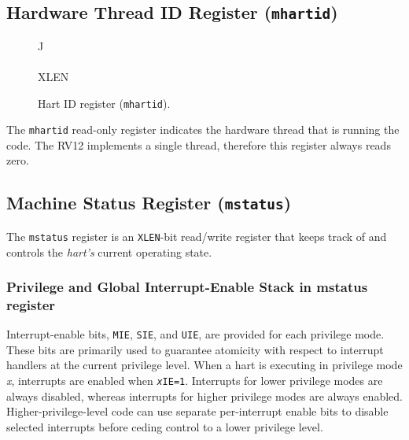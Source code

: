 \subsection{Hardware Thread ID Register
(\texttt{mhartid})}\label{hardware-thread-id-register-mhartid}

\ifdefined\MARKDOWN
\else

\begin{figure*}[htb]
	{\footnotesize
		\begin{center}
			\begin{tabular}{J}
				 \\
				\hline
				\\
				\hline
				XLEN \\
			\end{tabular}
		\end{center}
	}
	\vspace{-0.1in}
	\caption{Hart ID register (\texttt{mhartid}).}
	\label{fig:mhartidreg}
\end{figure*}

\fi

The \texttt{mhartid} read-only register indicates the hardware thread that is
running the code. The RV12 implements a single thread, therefore this
register always reads zero.

\subsection{Machine Status Register
(\texttt{mstatus})}\label{machine-status-register-mstatus}

The \texttt{mstatus} register is an \texttt{XLEN}-bit read/write register that keeps track
of and controls the \emph{hart's} current operating state.

\subsubsection{Privilege and Global Interrupt-Enable Stack in mstatus register}

Interrupt-enable bits, \texttt{MIE}, \texttt{SIE}, and \texttt{UIE}, are provided for each
privilege mode. These bits are primarily used to guarantee atomicity
with respect to interrupt handlers at the current privilege level. When
a hart is executing in privilege mode \emph{x}, interrupts are enabled
when \texttt{\emph{x}IE=1}. Interrupts for lower privilege modes are always
disabled, whereas interrupts for higher privilege modes are always
enabled. Higher-privilege-level code can use separate per-interrupt
enable bits to disable selected interrupts before ceding control to a
lower privilege level.

